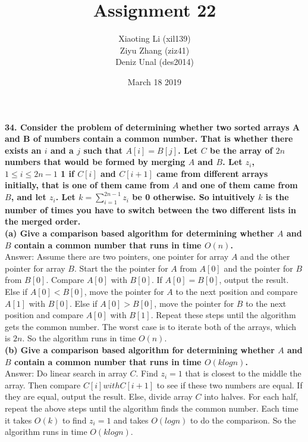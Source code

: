 \documentclass{article}
\title{Assignment 22}
\author{Xiaoting Li (xil139) \\
Ziyu Zhang (ziz41) \\
Deniz Unal (des2014)}
\date{March 18 2019}
\begin{document}
\maketitle

\noindent
\textbf{34. Consider the problem of determining whether two sorted arrays A and B of numbers
contain a common number. That is whether there exists an $i$ and a $j$ such that
$A[i] = B[j]$. Let $C$ be the array of $2n$ numbers that would be formed by merging $A$
and $B$. Let $z_i$, $1 \leq i \leq 2n - 1$ 1 if $C[i]$ and $C[i + 1]$ came from different arrays initially, that is one of them came from $A$ and one of them came from $B$, and let $z_i$. Let $k = \sum_{i=1}^{2n-1}z_{i}$
be 0 otherwise. So intuitively $k$ is the number of times you have to switch between the two different lists in the merged order.} \\ \newline
\textbf{(a) Give a comparison based algorithm for determining whether $A$ and $B$ contain a
common number that runs in time $O(n)$.} \\ \newline
Answer: Assume there are two pointers, one pointer for array $A$ and the other pointer for array $B$. Start the the pointer for $A$ from $A[0]$ and the pointer for $B$ from $B[0]$. Compare $A[0]$ with $B[0]$. If $A[0] = B[0]$, output the result. Else if $A[0] < B[0]$, move the pointer for $A$ to the next position and compare $A[1]$ with $B[0]$. Else if $A[0] > B[0]$, move the pointer for $B$ to the next position and compare $A[0]$ with $B[1]$. Repeat these steps until the algorithm gets the common number. The worst case is to iterate both of the arrays, which is $2n$. So the algorithm runs in time $O(n)$.\\ \newline
\textbf{(b) Give a comparison based algorithm for determining whether $A$ and $B$ contain a
common number that runs in time $O(klogn)$.} \\ \newline
Answer: Do linear search in array $C$. Find $z_i = 1$ that is closest to the middle the array. Then compare $C[i] with C[i+1]$ to see if these two numbers are equal. If they are equal, output the result. Else, divide array $C$ into halves. For each half, repeat the above steps until the algorithm finds the common number. Each time it takes $O(k)$ to find $z_i = 1$ and takes $O(logn)$ to do the comparison. So the algorithm runs in time $O(klogn)$.\\ \newline
\end{document}
